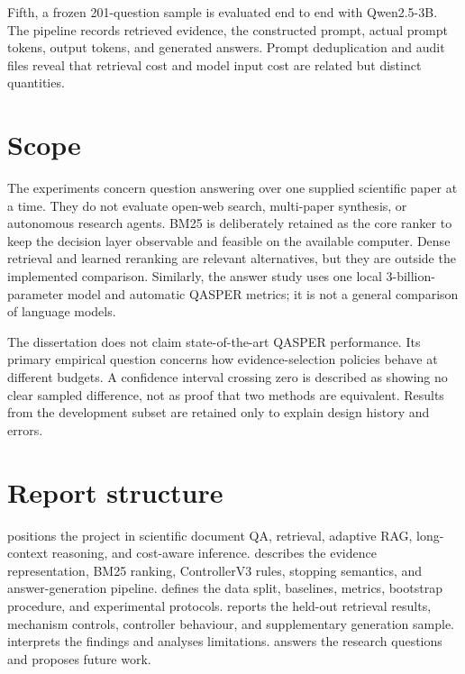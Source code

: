 Fifth, a frozen 201-question sample is evaluated end to end with Qwen2.5-3B. The pipeline records retrieved evidence, the constructed prompt, actual prompt tokens, output tokens, and generated answers. Prompt deduplication and audit files reveal that retrieval cost and model input cost are related but distinct quantities.

\section{Scope}

The experiments concern question answering over one supplied scientific paper at a time. They do not evaluate open-web search, multi-paper synthesis, or autonomous research agents. BM25 is deliberately retained as the core ranker to keep the decision layer observable and feasible on the available computer. Dense retrieval and learned reranking are relevant alternatives, but they are outside the implemented comparison. Similarly, the answer study uses one local 3-billion-parameter model and automatic QASPER metrics; it is not a general comparison of language models.

The dissertation does not claim state-of-the-art QASPER performance. Its primary empirical question concerns how evidence-selection policies behave at different budgets. A confidence interval crossing zero is described as showing no clear sampled difference, not as proof that two methods are equivalent. Results from the development subset are retained only to explain design history and errors.

\section{Report structure}

 positions the project in scientific document QA, retrieval, adaptive RAG, long-context reasoning, and cost-aware inference.  describes the evidence representation, BM25 ranking, ControllerV3 rules, stopping semantics, and answer-generation pipeline.  defines the data split, baselines, metrics, bootstrap procedure, and experimental protocols.  reports the held-out retrieval results, mechanism controls, controller behaviour, and supplementary generation sample.  interprets the findings and analyses limitations.  answers the research questions and proposes future work.

